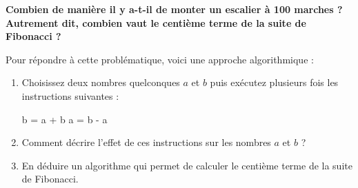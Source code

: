 \documentclass[oneside,12pt]{article}          %
\begin{document}
\begin{tcolorbox}[
    enhanced , arc = 3pt , top = 4mm ,
    fonttitle = \bfseries , title = Problématique , boxed title style = {arc = 3pt} ,
    coltitle = black , colbacktitle = white ,
    attach boxed title to top left = {xshift = 5mm , yshift = -4mm} ,
	]
	\restoreskip
	
	\textbf{Combien de manière il y a-t-il de monter un escalier à 100 marches ? Autrement dit, combien vaut le centième terme de la suite de Fibonacci ?}
	
	Pour répondre à cette problématique, voici une approche algorithmique :
	
	\begin{enumerate}
		\item Choisissez deux nombres quelconques $a$ et $b$ puis exécutez plusieurs fois les instructions suivantes :	
			\begin{codebox}
b = a + b
a = b - a		
			\end{codebox}
		
		\item Comment décrire l'effet de ces instructions sur les nombres $a$ et $b$ ?
		\item En déduire un algorithme qui permet de calculer le centième terme de la suite de Fibonacci.
	\end{enumerate}		
	



	
\end{tcolorbox}
\end{document}
